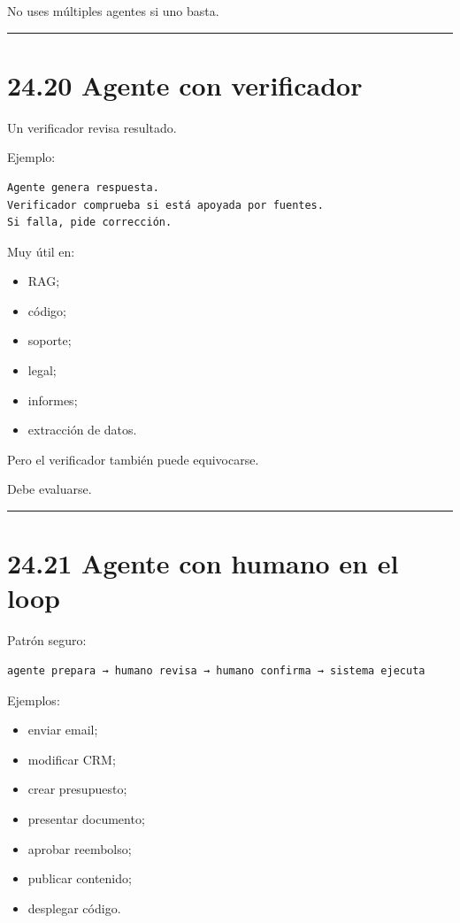 No uses múltiples agentes si uno basta.

\begin{center}\rule{0.5\linewidth}{0.5pt}\end{center}

\section{24.20 Agente con verificador}\label{agente-con-verificador}

Un verificador revisa resultado.

Ejemplo:

\begin{lstlisting}
Agente genera respuesta.
Verificador comprueba si está apoyada por fuentes.
Si falla, pide corrección.
\end{lstlisting}

Muy útil en:

\begin{itemize}
\tightlist
\item
  RAG;
\item
  código;
\item
  soporte;
\item
  legal;
\item
  informes;
\item
  extracción de datos.
\end{itemize}

Pero el verificador también puede equivocarse.

Debe evaluarse.

\begin{center}\rule{0.5\linewidth}{0.5pt}\end{center}

\section{24.21 Agente con humano en el
loop}\label{agente-con-humano-en-el-loop}

Patrón seguro:

\begin{lstlisting}
agente prepara → humano revisa → humano confirma → sistema ejecuta
\end{lstlisting}

Ejemplos:

\begin{itemize}
\tightlist
\item
  enviar email;
\item
  modificar CRM;
\item
  crear presupuesto;
\item
  presentar documento;
\item
  aprobar reembolso;
\item
  publicar contenido;
\item
  desplegar código.
\end{itemize}


